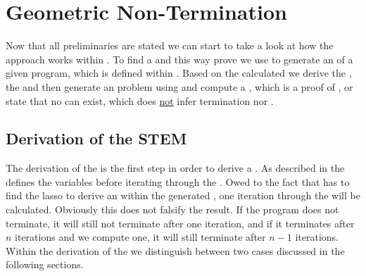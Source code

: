 \chapter{Geometric Non-Termination}
\label{chapter:geo-non-term}
Now that all preliminaries are stated we can start to take a look at how the approach works within \aprove. To find a \gna and this way prove \nonterm we use \aprove to generate an \its of a given program, which is defined within .
Based on the calculated \its we derive the \stem, the \loopt and then generate an  problem using  and compute a \gna, which is a proof of \nonterm, or state that no \gna can exist, which does \underline{not} infer termination nor \nonterm.

\section{Derivation of the STEM}
\label{sec:stem}
The derivation of the \stem is the first step in order to derive a \gna. As described in  the \stem defines the variables before iterating through the \loopt.  Owed to the fact that \aprove has to find the lasso to derive an \its within the generated \seg, one iteration through the \loopt will be calculated. Obviously this does not falsify the result. If the program does not terminate, it will still not terminate after one iteration, and if it terminates after $n$ iterations and we compute one, it will still terminate after $n-1$ iterations. \newline
Within the derivation of the \stem we distinguish between two cases discussed in the following sections.

